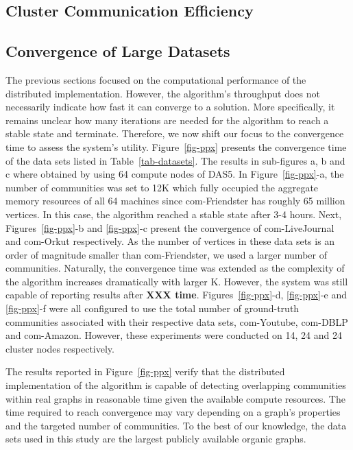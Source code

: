 \subsection{Cluster Communication Efficiency}

\subsection{Convergence of Large Datasets}
\begin{figure*}[t] %
  \centering
  \caption{Convergence time of 6 different data sets.}
  \label{fig-ppx}
\end{figure*}

The previous sections focused on the computational performance of the
distributed implementation. However, the algorithm's throughput does not
necessarily indicate how fast it can converge to a solution. More specifically, it
remains unclear how many iterations are needed for the algorithm to reach a
stable state and terminate. Therefore, we now shift our focus to the
convergence time to assess the system's utility. Figure~\ref{fig-ppx} presents
the convergence time of the data sets listed in Table~\ref{tab-datasets}.
%
The results in sub-figures a, b and c where obtained by using 64 compute nodes
of DAS5. In Figure~\ref{fig-ppx}-a, the number of communities was set to 12K
which fully occupied the aggregate memory resources of all 64 machines since
com-Friendster has roughly 65 million vertices. In this case, the algorithm
reached a stable state after 3-4 hours. Next, Figures~\ref{fig-ppx}-b and
\ref{fig-ppx}-c present the convergence of com-LiveJournal and com-Orkut
respectively. As the number of vertices in these data sets is an order of
magnitude smaller than com-Friendster, we used a larger number of
communities. Naturally, the convergence time was extended as the complexity of
the algorithm increases dramatically with larger K. However, the system was
still capable of reporting results after \textbf{XXX time}.
%
Figures~\ref{fig-ppx}-d, \ref{fig-ppx}-e and \ref{fig-ppx}-f were all
configured to use the total number of ground-truth communities associated with
their respective data sets, com-Youtube, com-DBLP and com-Amazon. However,
these experiments were conducted on 14, 24 and 24 cluster nodes respectively.

The results reported in Figure~\ref{fig-ppx} verify that the distributed
implementation of the algorithm is capable of detecting overlapping communities
within real graphs in reasonable time given the available compute resources.
The time required to reach convergence may vary depending on a graph's properties and
the targeted number of communities. To the best of our knowledge, the data sets
used in this study are the largest publicly available organic graphs.

